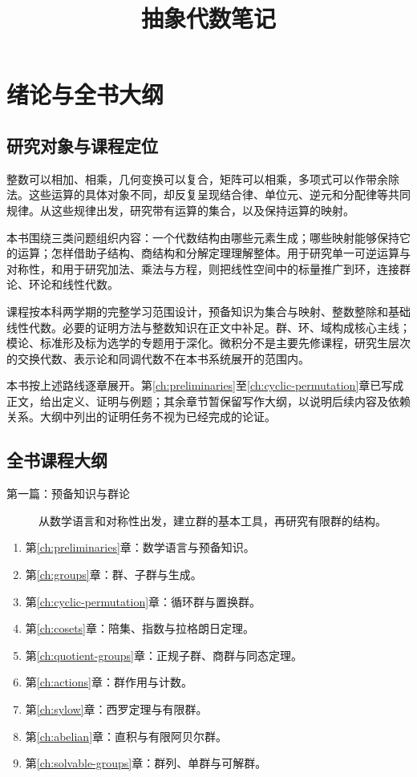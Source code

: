 \documentclass[UTF8,12pt,a4paper,fontset=fandol]{ctexbook}
\title{抽象代数笔记}
\author{}
\date{}
\begin{document}
\frontmatter
\maketitle
\tableofcontents

\chapter{绪论与全书大纲}

\section{研究对象与课程定位}

整数可以相加、相乘，几何变换可以复合，矩阵可以相乘，多项式可以作带余除法。这些运算的具体对象不同，却反复呈现结合律、单位元、逆元和分配律等共同规律。从这些规律出发，研究带有运算的集合，以及保持运算的映射。

本书围绕三类问题组织内容：一个代数结构由哪些元素生成；哪些映射能够保持它的运算；怎样借助子结构、商结构和分解定理理解整体。用于研究单一可逆运算与对称性，和用于研究加法、乘法与方程，则把线性空间中的标量推广到环，连接群论、环论和线性代数。

课程按本科两学期的完整学习范围设计，预备知识为集合与映射、整数整除和基础线性代数。必要的证明方法与整数知识在正文中补足。群、环、域构成核心主线；模论、标准形及标为选学的专题用于深化。微积分不是主要先修课程，研究生层次的交换代数、表示论和同调代数不在本书系统展开的范围内。

本书按上述路线逐章展开。第\ref{ch:preliminaries}至\ref{ch:cyclic-permutation}章已写成正文，给出定义、证明与例题；其余章节暂保留写作大纲，以说明后续内容及依赖关系。大纲中列出的证明任务不视为已经完成的论证。

\section{全书课程大纲}

\begin{description}
  \item[第一篇：预备知识与群论] 从数学语言和对称性出发，建立群的基本工具，再研究有限群的结构。
\end{description}
\begin{enumerate}
  \item 第\ref{ch:preliminaries}章：数学语言与预备知识。
  \item 第\ref{ch:groups}章：群、子群与生成。
  \item 第\ref{ch:cyclic-permutation}章：循环群与置换群。
  \item 第\ref{ch:cosets}章：陪集、指数与拉格朗日定理。
  \item 第\ref{ch:quotient-groups}章：正规子群、商群与同态定理。
  \item 第\ref{ch:actions}章：群作用与计数。
  \item 第\ref{ch:sylow}章：西罗定理与有限群。
  \item 第\ref{ch:abelian}章：直积与有限阿贝尔群。
  \item 第\ref{ch:solvable-groups}章：群列、单群与可解群。
\end{enumerate}
\end{document}
